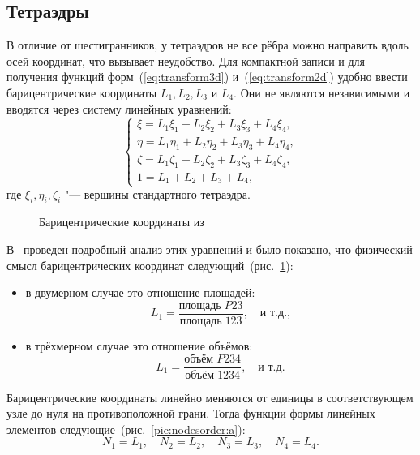 \subsection{Тетраэдры}

В отличие от шестигранников, у тетраэдров не все рёбра можно направить вдоль осей координат, что вызывает неудобство. Для компактной записи и для получения функций форм~(\ref{eq:transform3d}) и~(\ref{eq:transform2d}) удобно ввести барицентрические координаты \(L_1, L_2, L_3\) и \(L_4\). Они не являются независимыми и вводятся через систему линейных уравнений:
\begin{equation}\label{eq:barycentricsystem}
\left\{\begin{array}{l}
\xi   = L_1\xi_1   + L_2\xi_2   + L_3\xi_3   + L_4\xi_4,   \\
\eta  = L_1\eta_1  + L_2\eta_2  + L_3\eta_3  + L_4\eta_4,  \\
\zeta = L_1\zeta_1 + L_2\zeta_2 + L_3\zeta_3 + L_4\zeta_4, \\
1 = L_1 + L_2 + L_3 + L_4,
\end{array}\right.
\end{equation}
где \(\xi_i, \eta_i, \zeta_i\) "--- вершины стандартного тетраэдра.

\begin{figure}[h]
	{\centering
		\hfill
		\hfill
		\hfill
	}
	\caption{Барицентрические координаты из~\cite{Zienkiewicz:2000:en}}
	\label{pic:barycentriccoord}
\end{figure}

В~\cite{Zienkiewicz:2000:en} проведен подробный анализ этих уравнений и было показано, что физический смысл барицентрических координат следующий~(рис.~\ref{pic:barycentriccoord}):
\begin{itemize}
	\item в двумерном случае это отношение площадей:
	\[L_1 = \frac{\text{площадь}\; P23}{\text{площадь}\; 123},\quad  \text{и т.д.,}\]
	\item в трёхмерном случае это отношение объёмов:
	\[L_1 = \frac{\text{объём}\; P234}{\text{объём}\; 1234},\quad \text{и т.д.}\]
\end{itemize}

Барицентрические координаты линейно меняются от единицы в соответствующем узле до нуля на противоположной грани. Тогда функции формы линейных элементов следующие~(рис.~\ref{pic:nodesorder:a}):
\begin{equation}\label{eq:tr:tetra:lin}
N_1 = L_1,\quad N_2 = L_2,\quad N_3 = L_3,\quad N_4 = L_4.
\end{equation}

